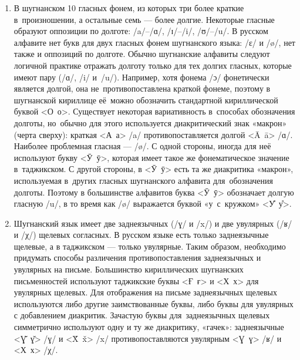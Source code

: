 \begin{enumerate}[(1)]

  \item В шугнанском 10 гласных фонем, из которых три более краткие в~произношении, а остальные семь — более долгие. Некоторые гласные образуют оппозиции по долготе: /a/–/ɑ/, /ɪ/–/i/, /ʊ/–/u/. В русском алфавите нет букв для двух гласных фонем шугнанского языка: /ɛ/ и /ø/, нет также и оппозиций по долготе. Обычно шугнанские алфавиты следуют логичной практике отражать долготу только для тех долгих гласных, которые имеют пару (/ɑ/, /i/ и~/u/). Например, хотя фонема /ɔ/ фонетически является долгой, она не~противопоставлена краткой фонеме, поэтому в шугнанской кириллице её~можно обозначить стандартной кириллической буквой <О~о>. Существует некоторая вариативность в~способах обозначения долготы, но~обычно для этого используется диакритический знак «макрон» (черта сверху): краткая <А~а> /a/ противопоставляется долгой <Ā~ā> /ɑ/. Наиболее проблемная гласная — /ø/. С одной стороны, иногда для неё используют букву <Ӯ~ӯ>, которая имеет такое же фонематическое значение в~таджикском. С другой стороны, в <Ӯ~ӯ> есть та же диакритика «макрон», используемая в~других гласных шугнанского алфавита для~обозначения долготы. Поэтому в большинстве алфавитов буква <Ӯ~ӯ> обозначает долгую гласную /u/, в то время как /ø/ выражается буквой «у~с~кружком» <У̊~у̊>.

  \item Шугнанский язык имеет две заднеязычных (/ɣ/ и /x/) и две увулярных (/ʁ/ и /χ/) щелевых согласных. В русском языке есть только заднеязычные щелевые, а в таджикском — только увулярные. Таким образом, необходимо придумать способы различения противопоставления заднеязычных и увулярных на письме. Большинство кириллических шугнанских письменностей используют таджикские буквы <Ғ~ғ> и <Х~х> для увулярных щелевых. Для отображения на письме заднеязычных щелевых используются либо другие заимствованные буквы, либо буквы для увулярных с добавлением диакритик. Зачастую буквы для~заднеязычных щелевых симметрично используют одну и ту же диакритику, «гачек»: заднеязычные <Ɣ̌~ɣ̌> /ɣ/ и <X̌~x̌> /x/ противопоставляются увулярным <Ɣ~ɣ> /ʁ/ и <Х~х> /χ/.


\end{enumerate}
